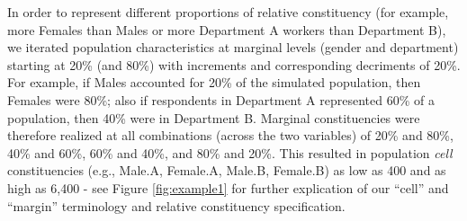 \documentclass[
  man,mask]{apa7}
\begin{document}
In order to represent different proportions of relative constituency (for example, more Females than Males or more Department A workers than Department B), we iterated population characteristics at marginal levels (gender and department) starting at 20\% (and 80\%) with increments and corresponding decriments of 20\%. For example, if Males accounted for 20\% of the simulated population, then Females were 80\%; also if respondents in Department A represented 60\% of a population, then 40\% were in Department B. Marginal constituencies were therefore realized at all combinations (across the two variables) of 20\% and 80\%, 40\% and 60\%, 60\% and 40\%, and 80\% and 20\%. This resulted in population \emph{cell} constituencies (e.g., Male.A, Female.A, Male.B, Female.B) as low as 400 and as high as 6,400 - see Figure \ref{fig:example1} for further explication of our ``cell'' and ``margin'' terminology and relative constituency specification.
\end{document}
